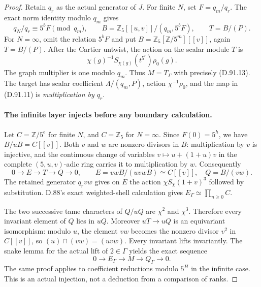 \begin{proof}
Retain \(q_r\) as the actual generator of \(J\).
For finite \(N\), set \(F=q_m/q_r\). The exact norm
identity modulo \(q_m\) gives
\[
 q_N/q_r\equiv5^b F\pmod{q_m},\qquad
 B=\mathbb Z_5[[u,v]]/(q_m,5^bF),\qquad T=B/(P).
                                                               \tag{D.91.12}
\]
For \(N=\infty\), omit the relation \(5^bF\) and put
\(B=\mathbb Z_5[\mathbb Z/5^m][[v]]\), again \(T=B/(P)\).
After the Cartier untwist, the action on the scalar module
\(T\) is
\[
 \chi(g)^{-1}S_{\chi(g)}(t^{5^r})\rho_0(g).
                                                               \tag{D.91.13}
\]
The graph multiplier is one modulo \(q_m\). Thus
\(M=T_\Gamma\) with precisely (D.91.13). The target
has scalar coefficient \(\Lambda/(q_m,P)\), action
\(\chi^{-1}\rho_0\), and the map in (D.91.11) is
\emph{multiplication by \(q_r\)}.

\paragraph{The infinite layer injects before any boundary calculation.}
Let \(C=\mathbb Z/5^e\) for finite \(N\), and
\(C=\mathbb Z_5\) for \(N=\infty\). Since \(F(0)=5^h\),
we have \(B/uB=C[[v]]\). Both \(v\) and \(w\) are
nonzero divisors in \(B\): multiplication by \(v\) is
injective, and the continuous change of variables
\(v\mapsto u+(1+u)v\) in the complete \((5,u,v)\)-adic
ring carries it to multiplication by \(w\). Consequently
\[
 0\longrightarrow E\longrightarrow T\longrightarrow Q\longrightarrow0,
 \qquad E=vwB/(uvwB)\simeq C[[v]],\quad Q=B/(vw).
                                                               \tag{D.91.14}
\]
The retained generator \(q_rvw\) gives on \(E\) the
action \(\chi S_\chi(1+v)^3\) followed by substitution.
D.88's exact weighted-shell calculation gives
\(E_\Gamma\simeq\prod_{n\ge0}C\).

The two successive tame characters of \(Q/uQ\) are
\(\chi^2\) and \(\chi^3\). Therefore every invariant
element of \(Q\) lies in \(uQ\). Moreover
\(uT\to uQ\) is an equivariant isomorphism: modulo
\(u\), the element \(vw\) becomes the nonzero divisor
\(v^2\) in \(C[[v]]\), so \((u)\cap(vw)=(uvw)\).
Every invariant lifts invariantly. The snake lemma for
the actual lift of \(2\in\Gamma\) yields the exact sequence
\[
       0\longrightarrow E_\Gamma\longrightarrow M
                 \longrightarrow Q_\Gamma\longrightarrow0.
                                                               \tag{D.91.15}
\]
The same proof applies to coefficient reductions modulo
\(5^H\) in the infinite case. This is an actual injection,
not a deduction from a comparison of ranks.


\end{proof}
